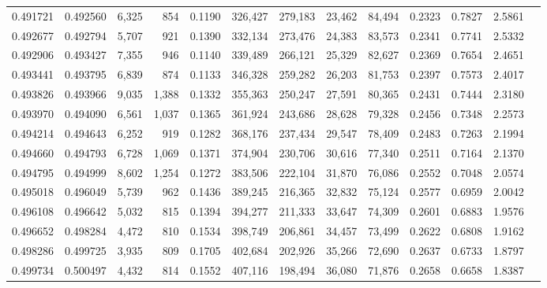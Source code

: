 \begin{tabular}{rrrrrrrrrrrrr}
0.491721 & 0.492560 &  6,325 &   854 &                                     0.1190 & 326,427 & 279,183 &  23,462 &  84,494 & 0.2323 & 0.7827 & 2.5861 \\
0.492677 & 0.492794 &  5,707 &   921 &                                     0.1390 & 332,134 & 273,476 &  24,383 &  83,573 & 0.2341 & 0.7741 & 2.5332 \\
0.492906 & 0.493427 &  7,355 &   946 &                                     0.1140 & 339,489 & 266,121 &  25,329 &  82,627 & 0.2369 & 0.7654 & 2.4651 \\
0.493441 & 0.493795 &  6,839 &   874 &                                     0.1133 & 346,328 & 259,282 &  26,203 &  81,753 & 0.2397 & 0.7573 & 2.4017 \\
0.493826 & 0.493966 &  9,035 & 1,388 &                                     0.1332 & 355,363 & 250,247 &  27,591 &  80,365 & 0.2431 & 0.7444 & 2.3180 \\
0.493970 & 0.494090 &  6,561 & 1,037 &                                     0.1365 & 361,924 & 243,686 &  28,628 &  79,328 & 0.2456 & 0.7348 & 2.2573 \\
0.494214 & 0.494643 &  6,252 &   919 &                                     0.1282 & 368,176 & 237,434 &  29,547 &  78,409 & 0.2483 & 0.7263 & 2.1994 \\
0.494660 & 0.494793 &  6,728 & 1,069 &                                     0.1371 & 374,904 & 230,706 &  30,616 &  77,340 & 0.2511 & 0.7164 & 2.1370 \\
0.494795 & 0.494999 &  8,602 & 1,254 &                                     0.1272 & 383,506 & 222,104 &  31,870 &  76,086 & 0.2552 & 0.7048 & 2.0574 \\
0.495018 & 0.496049 &  5,739 &   962 &                                     0.1436 & 389,245 & 216,365 &  32,832 &  75,124 & 0.2577 & 0.6959 & 2.0042 \\
0.496108 & 0.496642 &  5,032 &   815 &                                     0.1394 & 394,277 & 211,333 &  33,647 &  74,309 & 0.2601 & 0.6883 & 1.9576 \\
0.496652 & 0.498284 &  4,472 &   810 &                                     0.1534 & 398,749 & 206,861 &  34,457 &  73,499 & 0.2622 & 0.6808 & 1.9162 \\
0.498286 & 0.499725 &  3,935 &   809 &                                     0.1705 & 402,684 & 202,926 &  35,266 &  72,690 & 0.2637 & 0.6733 & 1.8797 \\
0.499734 & 0.500497 &  4,432 &   814 &                                     0.1552 & 407,116 & 198,494 &  36,080 &  71,876 & 0.2658 & 0.6658 & 1.8387 \\

\end{tabular}
